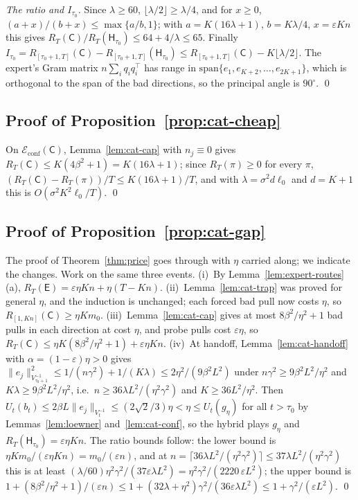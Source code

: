 \documentclass{article}
\theoremstyle{definition}
\theoremstyle{remark}
\newcommand{\eps}{\varepsilon}
\theoremstyle{remark}
\newcommand{\Cold}{\mathsf{C}}
\newcommand{\Exp}{\mathsf{E}}
\newcommand{\Hyb}{\mathsf{H}}
\begin{document}
\emph{The ratio and $I_{\tau_0}$.} Since $\lambda\ge60$, $\lfloor\lambda/2\rfloor\ge\lambda/4$,
and for $x\ge0$, $(a+x)/(b+x)\le\max\{a/b,1\}$; with $a=K(16\lambda+1)$,
$b=K\lambda/4$, $x=\eps Kn$ this gives $R_T(\Cold)/R_T(\Hyb_{\tau_0})\le64+4/\lambda\le65$.
Finally $I_{\tau_0}=R_{[\tau_0+1,T]}(\Cold)-R_{[\tau_0+1,T]}(\Hyb_{\tau_0})\le R_{[\tau_0+1,T]}(\Cold)-K\lfloor\lambda/2\rfloor$.
The expert's Gram matrix $n\sum_iq_iq_i^\top$ has range in
$\mathrm{span}\{e_1,e_{K+2},\dots,e_{2K+1}\}$, which is orthogonal to the span of
the bad directions, so the principal angle is $90^\circ$. \qed

\subsection{Proof of Proposition~\ref{prop:cat-cheap}}

On $\mathcal E_{\mathrm{conf}}(\Cold)$, Lemma~\ref{lem:cat-cap} with $n_j\equiv0$
gives $R_T(\Cold)\le K(4\beta^2+1)=K(16\lambda+1)$; since $R_T(\pi)\ge0$ for every
$\pi$, $(R_T(\Cold)-R_T(\pi))/T\le K(16\lambda+1)/T$, and with $\lambda=\sigma^2d\ell_0$
and $d=K+1$ this is $O(\sigma^2K^2\ell_0/T)$. \qed

\subsection{Proof of Proposition~\ref{prop:cat-gap}}

The proof of Theorem~\ref{thm:price} goes through with $\eta$ carried along;
we indicate the changes. Work on the same three events. (i)~By
Lemma~\ref{lem:expert-routes}(a), $R_T(\Exp)=\eps\eta Kn+\eta(T-Kn)$.
(ii)~Lemma~\ref{lem:cat-trap} was proved for general $\eta$, and the induction
is unchanged; each forced bad pull now costs $\eta$, so
$R_{[1,Kn]}(\Cold)\ge\eta Km_0$. (iii)~Lemma~\ref{lem:cat-cap} gives at most
$8\beta^2/\eta^2+1$ bad pulls in each direction at cost $\eta$, and probe pulls
cost $\eps\eta$, so $R_T(\Cold)\le\eta K(8\beta^2/\eta^2+1)+\eps\eta Kn$.
(iv)~At handoff, Lemma~\ref{lem:cat-handoff} with $\alpha=(1-\eps)\eta>0$ gives
$\|e_j\|^2_{V_{\tau_0+1}^{-1}}\le1/(n\gamma^2)+1/(K\lambda)\le2\eta^2/(9\beta^2L^2)$ under
$n\gamma^2\ge9\beta^2L^2/\eta^2$ and $K\lambda\ge9\beta^2L^2/\eta^2$, i.e.\ $n\ge36\lambda L^2/(\eta^2\gamma^2)$
and $K\ge36L^2/\eta^2$. Then $U_t(b_t)\le2\beta L\|e_j\|_{V_t^{-1}}\le(2\sqrt2/3)\eta<\eta\le U_t(g_\eta)$
for all $t>\tau_0$ by Lemmas~\ref{lem:loewner} and~\ref{lem:cat-conf}, so the
hybrid plays $g_\eta$ and $R_T(\Hyb_{\tau_0})=\eps\eta Kn$. The ratio bounds
follow: the lower bound is $\eta Km_0/(\eps\eta Kn)=m_0/(\eps n)$, and at
$n=\lceil36\lambda L^2/(\eta^2\gamma^2)\rceil\le37\lambda L^2/(\eta^2\gamma^2)$ this is at least
$(\lambda/60)\eta^2\gamma^2/(37\eps\lambda L^2)=\eta^2\gamma^2/(2220\,\eps L^2)$; the upper bound
is $1+(8\beta^2/\eta^2+1)/(\eps n)\le1+(32\lambda+\eta^2)\gamma^2/(36\eps\lambda L^2)\le1+\gamma^2/(\eps L^2)$. \qed
\end{document}
